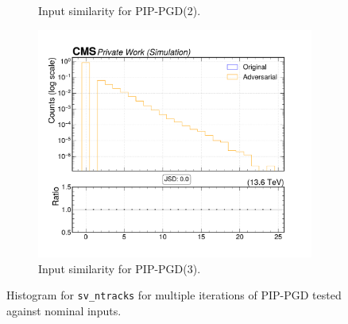\begin{figure}[htbp]
\begin{subfigure}[t]{0.32\textwidth}
    \caption*{Input similarity for PIP-PGD(2).}
  \end{subfigure}\hfill
  \begin{subfigure}[t]{0.32\textwidth}
    \includegraphics[width=\linewidth]{media/output/features/compare/combined_it_3/cmp_vtx_arr_sv_ntracks.pdf}
    \caption*{Input similarity for PIP-PGD(3).}
  \end{subfigure}

  \caption*{Histogram for \texttt{sv\_ntracks} for multiple iterations of PIP-PGD tested against nominal inputs.}
  \label{fig:combined_input_sv_ntracks}
\end{figure}


